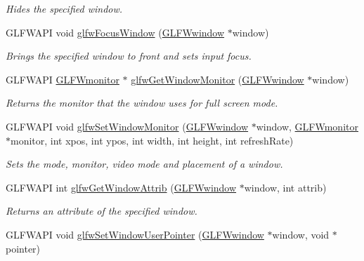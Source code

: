 \begin{CompactItemize}
\begin{CompactList}\small\item\em Hides the specified window. \item\end{CompactList}\item 
GLFWAPI void \hyperlink{group__window_g0da0e3daaa2d100f44a115c09077b510}{glfwFocusWindow} (\hyperlink{group__window_g3c96d80d363e67d13a41b5d1821f3242}{GLFWwindow} $\ast$window)
\begin{CompactList}\small\item\em Brings the specified window to front and sets input focus. \item\end{CompactList}\item 
GLFWAPI \hyperlink{group__monitor_g8d9efd1cde9426692c73fe40437d0ae3}{GLFWmonitor} $\ast$ \hyperlink{group__window_gf1525cb3bccd5789c702cc9676ef3403}{glfwGetWindowMonitor} (\hyperlink{group__window_g3c96d80d363e67d13a41b5d1821f3242}{GLFWwindow} $\ast$window)
\begin{CompactList}\small\item\em Returns the monitor that the window uses for full screen mode. \item\end{CompactList}\item 
GLFWAPI void \hyperlink{group__window_g12fabf78575e59c00f822f323ae0b6ae}{glfwSetWindowMonitor} (\hyperlink{group__window_g3c96d80d363e67d13a41b5d1821f3242}{GLFWwindow} $\ast$window, \hyperlink{group__monitor_g8d9efd1cde9426692c73fe40437d0ae3}{GLFWmonitor} $\ast$monitor, int xpos, int ypos, int width, int height, int refreshRate)
\begin{CompactList}\small\item\em Sets the mode, monitor, video mode and placement of a window. \item\end{CompactList}\item 
GLFWAPI int \hyperlink{group__window_g1bb0c7e100418e284dbb800789c63d40}{glfwGetWindowAttrib} (\hyperlink{group__window_g3c96d80d363e67d13a41b5d1821f3242}{GLFWwindow} $\ast$window, int attrib)
\begin{CompactList}\small\item\em Returns an attribute of the specified window. \item\end{CompactList}\item 
GLFWAPI void \hyperlink{group__window_gcc9e68faee3c1763b54cd9bc405cf43e}{glfwSetWindowUserPointer} (\hyperlink{group__window_g3c96d80d363e67d13a41b5d1821f3242}{GLFWwindow} $\ast$window, void $\ast$pointer)

\end{CompactItemize}
